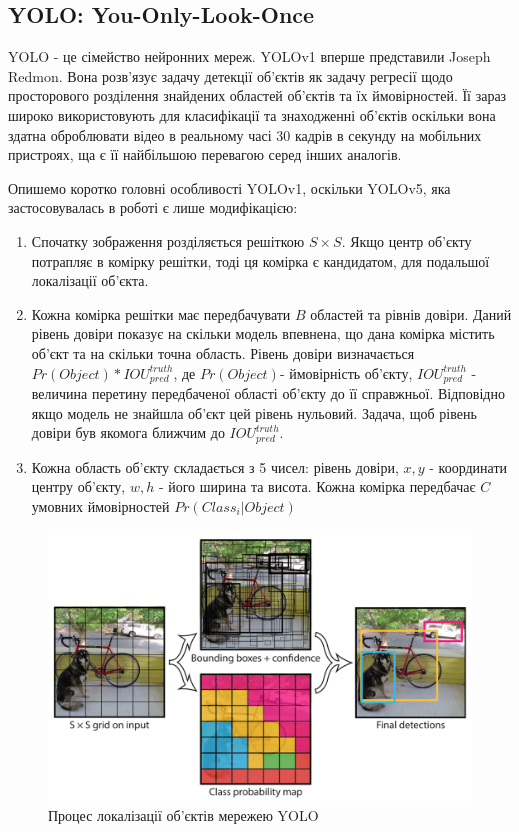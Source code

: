 \subsection{YOLO: You-Only-Look-Once}

YOLO - це сімейство нейронних мереж. YOLOv1 вперше представили Joseph Redmon.
Вона розв'язує задачу детекції об'єктів як задачу регресії
щодо просторового розділення знайдених областей об'єктів та їх
ймовірностей. Її зараз широко використовують для класифікації та знаходженні об'єктів
оскільки вона здатна оброблювати відео в реальному часі 30 кадрів в секунду
на мобільних пристроях, ща є її найбільшою перевагою серед інших аналогів.

Опишемо коротко головні особливості YOLOv1, оскільки YOLOv5, яка застосовувалась
в роботі є лише модифікацією:
\begin{enumerate}
    \item Спочатку зображення розділяється решіткою $S \times S$.
          Якщо центр об'єкту потрапляє в комірку решітки, тоді ця комірка
          є кандидатом, для подальшої локалізації об'єкта.
    \item Кожна комірка решітки має передбачувати $B$ областей та рівнів
          довіри. Даний рівень довіри показує на скільки модель впевнена,
          що дана комірка містить об'єкт та на скільки точна область.
          Рівень довіри визначається $Pr(Object)*{IOU}_{pred}^{truth}$,
          де $Pr(Object)$- ймовірність об'єкту, ${IOU}_{pred}^{truth}$ - величина
          перетину передбаченої області об'єкту до її справжньої.
          Відповідно якщо модель не знайшла об'єкт цей рівень нульовий.
          Задача, щоб рівень довіри був якомога ближчим до ${IOU}_{pred}^{truth}$.
    \item Кожна область об'єкту складається з 5 чисел: рівень довіри,
          $x, y$ - координати центру об'єкту,  $w, h$ - його ширина та висота.
          Кожна комірка передбачає $C$ умовних ймовірностей $Pr(Class_i|Object)$
\end{enumerate}

\begin{figure}[H]
    \includegraphics[width=0.5\linewidth]{images/cnn_yolo1}
    \centering
    \caption{Процес локалізації об'єктів мережею YOLO \cite{yolov1}
    }
\end{figure}

